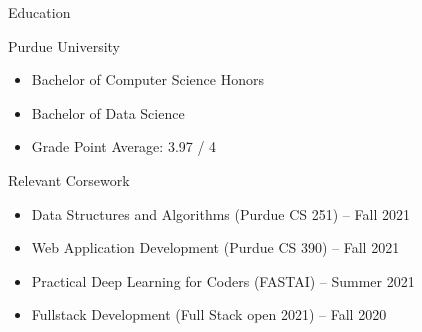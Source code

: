 \documentclass{article}
\newlength{\tabin}
\newlength{\secsep}
\newcommand{\lineunder}{\vspace*{-8pt} \\ \hspace*{-6pt} \hrulefill \\ \vspace*{-15pt}}
\newenvironment{tabbedsection}[1]{
  \begin{list}{}{
      \setlength{\itemsep}{0pt}
      \setlength{\labelsep}{0pt}
      \setlength{\labelwidth}{0pt}
      \setlength{\leftmargin}{\tabin}
      \setlength{\rightmargin}{\tabin}
      \setlength{\listparindent}{0pt}
      \setlength{\parsep}{0pt}
      \setlength{\parskip}{0pt}
      \setlength{\partopsep}{0pt}
      \setlength{\topsep}{#1}
    }
  \item[]
}{\end{list}}
\newenvironment{resume_section}[1]{
  \filbreak
  \vspace{2\secsep}
  \textsc{\large#1}
  \lineunder
  \begin{tabbedsection}{\secsep}
}{\end{tabbedsection}}
\newenvironment{resume_subsection}[2][]{
  \textbf{#2} \hfill {\footnotesize #1} \hspace{2em}
  \begin{tabbedsection}{0.5\secsep}
}{\end{tabbedsection}}
\newenvironment{subitems}{
  \renewcommand{\labelitemi}{-}
  \begin{itemize}
      \setlength{\labelsep}{1em}
}{\end{itemize}}
\begin{document}
\begin{resume_section}{Education}
  
  \begin{resume_subsection}{Purdue University}
    
    \begin{subitems}
      \item Bachelor of Computer Science Honors
      \item Bachelor of Data Science
      \item Grade Point Average: 3.97 / 4
    \end{subitems}
  
  \end{resume_subsection}
  
  \begin{resume_subsection}[]{Relevant Corsework}
  	
	\begin{subitems}
		\item Data Structures and Algorithms (Purdue CS 251) -- Fall 2021
		\item Web Application Development (Purdue CS 390) -- Fall 2021
		\item Practical Deep Learning for Coders (FASTAI) -- Summer 2021
		\item Fullstack Development (Full Stack open 2021) -- Fall 2020
	\end{subitems}  	
  	
  \end{resume_subsection}
  
\end{resume_section}
\end{document}
